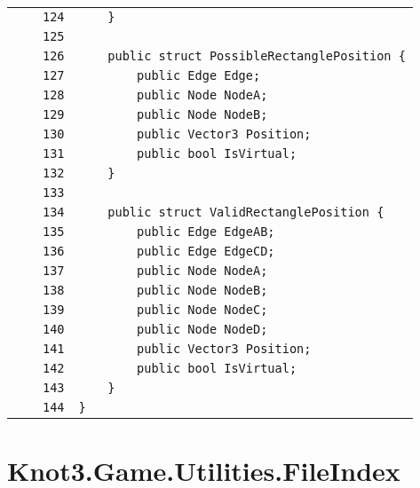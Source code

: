 \documentclass[a4paper,10pt]{article}
\begin{document}
\begin{longtable}[l]{lrrl}
\cellcolor{gray} &  & \verb~124~ & \verb~    }~\\
\cellcolor{gray} &  & \verb~125~ & \verb~~\\
\cellcolor{gray} &  & \verb~126~ & \verb~    public struct PossibleRectanglePosition {~\\
\cellcolor{gray} &  & \verb~127~ & \verb~        public Edge Edge;~\\
\cellcolor{gray} &  & \verb~128~ & \verb~        public Node NodeA;~\\
\cellcolor{gray} &  & \verb~129~ & \verb~        public Node NodeB;~\\
\cellcolor{gray} &  & \verb~130~ & \verb~        public Vector3 Position;~\\
\cellcolor{gray} &  & \verb~131~ & \verb~        public bool IsVirtual;~\\
\cellcolor{gray} &  & \verb~132~ & \verb~    }~\\
\cellcolor{gray} &  & \verb~133~ & \verb~~\\
\cellcolor{gray} &  & \verb~134~ & \verb~    public struct ValidRectanglePosition {~\\
\cellcolor{gray} &  & \verb~135~ & \verb~        public Edge EdgeAB;~\\
\cellcolor{gray} &  & \verb~136~ & \verb~        public Edge EdgeCD;~\\
\cellcolor{gray} &  & \verb~137~ & \verb~        public Node NodeA;~\\
\cellcolor{gray} &  & \verb~138~ & \verb~        public Node NodeB;~\\
\cellcolor{gray} &  & \verb~139~ & \verb~        public Node NodeC;~\\
\cellcolor{gray} &  & \verb~140~ & \verb~        public Node NodeD;~\\
\cellcolor{gray} &  & \verb~141~ & \verb~        public Vector3 Position;~\\
\cellcolor{gray} &  & \verb~142~ & \verb~        public bool IsVirtual;~\\
\cellcolor{gray} &  & \verb~143~ & \verb~    }~\\
\cellcolor{gray} &  & \verb~144~ & \verb~}~\\
\end{longtable}
\newpage
\section{Knot3.Game.Utilities.FileIndex}
\end{document}
